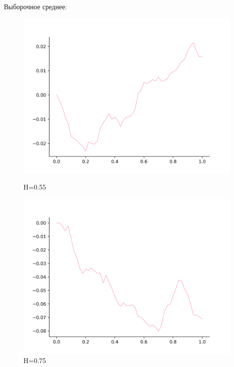 \documentclass[a4paper,12pt]{article}
\numberwithin{equation}{section}
\begin{document}
	Выборочное среднее:
	\begin{figure}[H]
		\includegraphics[scale=0.4]{mean-2-55.png}
		\caption{H=0.55}
		\endminipage\hfill
		\includegraphics[scale=0.4]{mean-2-75.png}
		\caption{H=0.75}
		\endminipage\hfill
	\end{figure}
	
\end{document}
